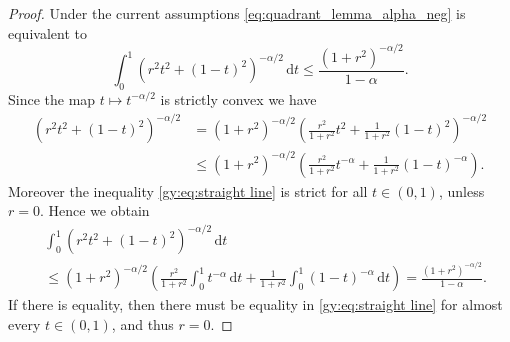 \documentclass[10pt,leqno]{amsart}
\newcommand{\dd}{\, \mathrm{d}}
\numberwithin{Theorem}{section}
\theoremstyle{definition}
\theoremstyle{remark}
\numberwithin{equation}{section}
\numberwithin{equation}{section}
\begin{document}
\begin{proof}
Under the current assumptions \eqref{eq:quadrant_lemma_alpha_neg} is equivalent to
\[
\int_0^1 \left( r^2 t^2 +(1-t)^2 \right)^{-\alpha/2} \dd t \leq \frac{(1+r^2)^{-\alpha/2}}{1-\alpha}.
\]
Since the map $t \mapsto t^{-\alpha/2}$ is strictly convex we have
\begin{equation}\begin{split}\label{gy:eq:straight line}
    \left( r^2 t^2 +(1-t)^2 \right)^{-\alpha/2} &= (1+r^2)^{-\alpha/2} \left( \frac{r^2}{1+r^2} t^2 + \frac{1}{1+r^2}(1-t)^2 \right)^{-\alpha/2} \\
    &\leq (1+r^2)^{-\alpha/2} \left( \frac{r^2}{1+r^2} t^{-\alpha} + \frac{1}{1+r^2}(1-t)^{-\alpha} \right).
\end{split}\end{equation}
Moreover the inequality \eqref{gy:eq:straight line} is strict for all $t\in (0,1)$, unless $r=0.$
Hence we obtain
\begin{align*}
    &\int_0^1 \left( r^2 t^2 +(1-t)^2 \right)^{-\alpha/2} \dd t  \\ &\leq (1+r^2)^{-\alpha/2} \left( \frac{r^2}{1+r^2}  \int_0^1 t^{-\alpha} \dd t+ \frac{1}{1+r^2} \int_0^1 (1-t)^{-\alpha} \dd t \right) = \frac{(1+r^2)^{-\alpha/2}}{1-\alpha}.
\end{align*}
If there is equality, then there must be equality in \eqref{gy:eq:straight line} for almost every $t\in (0,1)$, and thus $r=0.$


\end{proof}
\end{document}
